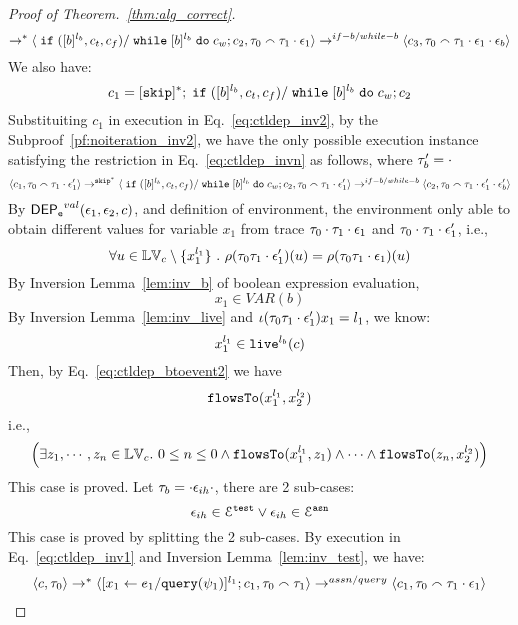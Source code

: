\begin{proof}[Proof of Theorem.~\ref{thm:alg_correct}]
\[ \rightarrow^{*} 
  \langle \;\mathtt{if}\;([b]{}^{l_b}, c_t, c_f) / \;\mathtt{while}\; [b]{}^{l_b} \;\mathtt{do}\; c_w; {c}_2, 
  \mathtt{\tau}_0 \smallfrown \mathtt{\tau}_1 \cdot \mathtt{\epsilon}_1 \rangle 
  \rightarrow^{if-b / while-b} 
  \langle {c}_3,  \mathtt{\tau}_0 \smallfrown \mathtt{\tau}_1 \cdot \mathtt{\epsilon}_1 \cdot \mathtt{\epsilon}_b \rangle 
 \]
 We also have:
 \[
 c_1 = [\mathtt{skip}]^*;\;\mathtt{if}\;([b]{}^{l_b}, c_t, c_f) / \;\mathtt{while}\; [b]{}^{l_b} \;\mathtt{do}\; c_w; {c}_2
 \]
Substituiting $c_1$ in execution in Eq.~\ref{eq:ctldep_inv2}, by the Subproof~\ref{pf:noiteration_inv2}, 
we have the only possible execution instance satisfying 
the restriction in Eq.~\ref{eq:ctldep_invn} as follows, where $\mathtt{\tau}_b' = \cdot$
%
 \[
  \langle c_1, \mathtt{\tau}_0 \smallfrown \mathtt{\tau}_1 \cdot \mathtt{\epsilon}_1' \rangle 
  \rightarrow^{\mathtt{skip}^*} 
  \langle 
  \;\mathtt{if}\;([b]{}^{l_b}, c_t, c_f) / \;\mathtt{while}\; [b]{}^{l_b} \;\mathtt{do}\; c_w; {c}_2, 
  \mathtt{\tau}_0 \smallfrown \mathtt{\tau}_1 \cdot \mathtt{\epsilon}_1' \rangle 
  \rightarrow^{if-b / while-b} 
  \langle {c}_2,  \mathtt{\tau}_0 \smallfrown \mathtt{\tau}_1 \cdot \mathtt{\epsilon}_1' \cdot \mathtt{\epsilon}_b' \rangle 
 \]
By $\mathsf{DEP_{\mathtt{e}}}^{val}(\mathtt{\epsilon}_1, \mathtt{\epsilon}_2, c)$, and definition of environment, 
the environment only able to obtain different values for variable $x_1$ 
from trace $\mathtt{\tau}_0 \cdot \mathtt{\tau}_1 \cdot \mathtt{\epsilon}_1$ and 
$\mathtt{\tau}_0 \cdot \mathtt{\tau}_1 \cdot \mathtt{\epsilon}_1'$, i.e.,
\[
  \forall u \in \mathbb{LV}_c \setminus \{x_1^{l_1}\} ~.~
  \rho(\mathtt{\tau}_0 \mathtt{\tau}_1 \cdot \mathtt{\epsilon}_1') (u) =  
  \rho(\mathtt{\tau}_0 \mathtt{\tau}_1 \cdot \mathtt{\epsilon}_1) (u)
\]
%
By {Inversion Lemma~\ref{lem:inv_b}} of boolean expression evaluation,
 \[
  x_1 \in VAR(b)
 \]
 By Inversion Lemma~\ref{lem:inv_live} and $\iota(\mathtt{\tau}_0 \mathtt{\tau}_1 \cdot \mathtt{\epsilon}_1') x_1 = l_1$, we know:
\[
  x_1^{l_1} \in \mathtt{live}^{l_b}(c)
\]
 Then, by Eq.~\ref{eq:ctldep_btoevent2} we have
 \[
 \mathtt{flowsTo}(x_1^{l_1}, x_2^{l_2})
 \]
 i.e.,
 \[
 \Big( \exists z_1, \cdots, z_n \in \mathbb{LV}_{{c}}. ~ 0 \leq n \leq 0 \land
  \mathtt{flowsTo}(x_1^{l_1}, z_1) 
  \land \cdots \land \mathtt{flowsTo}(z_n, x_2^{l_2}) \Big)
 \]
 This case is proved.
%
 Let $\mathtt{\tau}_b = \cdot \mathtt{\epsilon}_{ih} \cdot$, there are 2 sub-cases: 
 \[
 \mathtt{\epsilon}_{ih} \in \mathcal{E}^{\mathtt{{test}}} \lor \mathtt{\epsilon}_{ih} \in \mathcal{E}^{\mathtt{{asn}}}
 \]
 This case is proved by splitting the 2 sub-cases.
By execution in Eq.~\ref{eq:ctldep_inv1} and {Inversion Lemma~\ref{lem:inv_test}}, we have:
%
\[
  \begin{array}{l}   
  \langle {c}, \mathtt{\tau}_0 \rangle 
  \rightarrow^{*} 
  \langle [\mathrel{ {x}_1 \leftarrow e_1 / {\tt query}(\psi_1) }]^{l_1} ; {c}_1, \mathtt{\tau}_0 \smallfrown \mathtt{\tau}_1 \rangle  
  \rightarrow^{assn/query}
  \langle c_1, \mathtt{\tau}_0 \smallfrown \mathtt{\tau}_1 \cdot \mathtt{\epsilon}_1 \rangle 
  \\ 

\end{array}\]
\end{proof}
